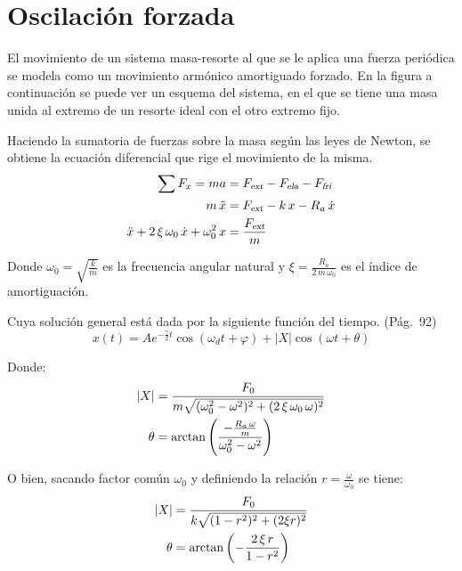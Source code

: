 \documentclass[a5paper,12pt,twoside]{book}
\begin{document}
\section{Oscilación forzada}
\label{sec:oscilacionForzada}

El movimiento de un sistema masa-resorte al que se le aplica una fuerza periódica se modela como un movimiento armónico amortiguado forzado. En la figura a continuación se puede ver un esquema del sistema, en el que se tiene una masa unida al extremo de un resorte ideal con el otro extremo fijo.

\begin{center}
    \def\svgwidth{0.5\linewidth}
    
\end{center}

Haciendo la sumatoria de fuerzas sobre la masa según las leyes de Newton, se obtiene la ecuación diferencial que rige el movimiento de la misma.
\begin{align*}
    \sum F_x = m a &= {{F}_\textsl{{ext}}} - {{F}_\textsl{{ela}}} - {{F}_\textsl{{fri}}}
    \\
    m \, \ddot{x} &= {{F}_\textsl{{ext}}} - k \, x - R_a \, \dot{x}
    \\
    \ddot{x} + 2 \, \xi \, \omega_0 \, \dot{x} + \omega_0^2 \, x &= \frac{{{F}_\textsl{{ext}}}}{m}
\end{align*}

Donde $\omega_0=\sqrt{\frac{k}{m}}$ es la frecuencia angular natural y $\xi=\frac{R_a}{2 \, m \, \omega_0}$ es el índice de amortiguación.

Cuya solución general está dada por la siguiente función del tiempo. \cite{1} (Pág.~92)
\begin{equation*}
    x(t) = A e^{-\tfrac{\gamma}{2}t} \cos{(\omega_d t + \varphi)} + |X| \cos (\omega t + \theta)
\end{equation*}

Donde:
\begin{align*}
    {\left| {X} \right|} &= \frac{F_0}{m \sqrt{(\omega_0^2-\omega^2)^2+(2 \, \xi \, \omega_0 \, \omega)^2}}
    \\
    \theta &= \arctan \left( \frac{-\frac{R_a \, \omega}{m}}{\omega_0^2 - \omega^2} \right)
\end{align*}

O bien, sacando factor común $\omega_0$ y definiendo la relación $r = \frac{\omega}{\omega_0}$ se tiene:
\begin{align*}
    {\left| {X} \right|} &= \frac{F_0}{k \sqrt{(1-r^2)^2+(2 \xi r)^2}}
    \\
    \theta &= \arctan \left( - \frac{2 \, \xi \, r}{1-r^2} \right)
\end{align*}
\end{document}
